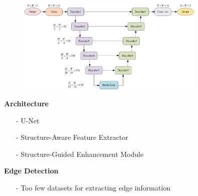 \documentclass[CJK,aspectratio=169]{beamer}  %
\begin{document}
	\begin{frame}
		\begin{figure}[htbp]
			\begin{center}
				\includegraphics[width=0.8\textwidth]{picture/LLIE/My Architecture/ULite_Enhance}
			\end{center}
		\end{figure}
		
		\begin{minipage}{.45\textwidth}
			\textbf{\tiny Architecture}
			\begin{itemize}\tiny
				\item [-] U-Net
				
				\item [-] Structure-Aware Feature Extractor
				
				\item [-] Structure-Guided Enhancement Module
			\end{itemize}
		\end{minipage}
		\begin{minipage}{.45\textwidth}
			\textbf{\tiny Edge Detection}
			\begin{itemize}\tiny
				\item [-] Too few datasets for extracting edge information
				

\end{itemize}
\end{minipage}
\end{frame}
\end{document}
